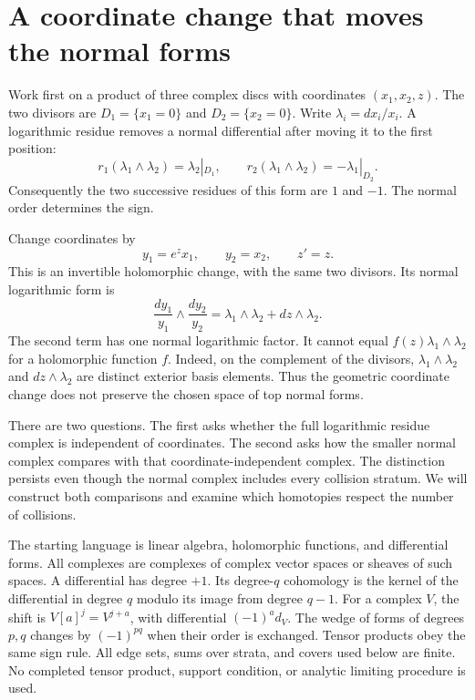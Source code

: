 \section{A coordinate change that moves the normal forms}
\label{sec:deciding-coordinate-change}

Work first on a product of three complex discs with coordinates $(x_1,x_2,z)$.
The two divisors are $D_1=\{x_1=0\}$ and $D_2=\{x_2=0\}$.
Write $\lambda_i=dx_i/x_i$.
A logarithmic residue removes a normal differential after moving it to the first position:
\[
r_1(\lambda_1\wedge\lambda_2)=\lambda_2|_{D_1},\qquad
r_2(\lambda_1\wedge\lambda_2)=-\lambda_1|_{D_2}.
\]
Consequently the two successive residues of this form are $1$ and $-1$.
The normal order determines the sign.

Change coordinates by
\begin{equation}
\label{eq:two-normal-unit}
y_1=e^z x_1,\qquad y_2=x_2,\qquad z'=z.
\end{equation}
This is an invertible holomorphic change, with the same two divisors.
Its normal logarithmic form is
\[
\frac{dy_1}{y_1}\wedge\frac{dy_2}{y_2}
=\lambda_1\wedge\lambda_2+dz\wedge\lambda_2.
\]
The second term has one normal logarithmic factor.
It cannot equal $f(z)\lambda_1\wedge\lambda_2$ for a holomorphic function $f$.
Indeed, on the complement of the divisors,
$\lambda_1\wedge\lambda_2$ and $dz\wedge\lambda_2$ are distinct exterior basis elements.
Thus the geometric coordinate change does not preserve the chosen space of top normal forms.

There are two questions.
The first asks whether the full logarithmic residue complex is independent of coordinates.
The second asks how the smaller normal complex compares with that coordinate-independent complex.
The distinction persists even though the normal complex includes every collision stratum.
We will construct both comparisons and examine which homotopies respect the number of collisions.

The starting language is linear algebra, holomorphic functions, and differential forms.
All complexes are complexes of complex vector spaces or sheaves of such spaces.
A differential has degree $+1$.
Its degree-$q$ cohomology is the kernel of the differential in degree $q$ modulo its image from degree $q-1$.
For a complex $V$, the shift is $V[a]^j=V^{j+a}$, with differential $(-1)^a d_V$.
The wedge of forms of degrees $p,q$ changes by $(-1)^{pq}$ when their order is exchanged.
Tensor products obey the same sign rule.
All edge sets, sums over strata, and covers used below are finite.
No completed tensor product, support condition, or analytic limiting procedure is used.

